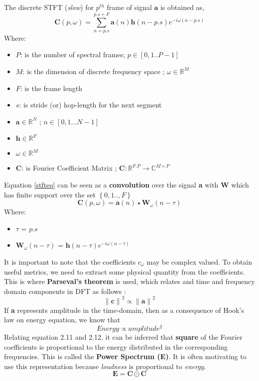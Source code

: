 \noindent The discrete STFT (\textit{slow}) for $p^{th}$ frame of signal $\textbf{a}$ is obtained as,
\begin{equation}
\label{stfteq}
\textbf{C}(p, \omega ) = \displaystyle\sum_{n=p.s}^{p.s + F}\textbf{a}(n)\textbf{h}(n-p.s)e^{-i \omega (n-p.s)}
\end{equation}
Where:
\begin{itemize}[label=]
    \setlength\itemsep{0em}
    \item $P$: is the number of spectral frames; $p \in [0,1..P-1]$ 
    \item $M$: is the dimension of discrete frequency space ; $\omega \in \mathbb{R}^{M}$
    \item $F$: is the frame length 
    \item $s$: is stride (or) hop-length for the next segment
    \item $\textbf{a} \in  \mathbb{R}^{N}$ ; $n \in [0,1...N-1]$
    \item $\textbf{h} \in  \mathbb{R}^{F}$
    \item $\omega \in  \mathbb{R}^{M}$
    \item $\textbf{C}$: is Fourier Coefficient Matrix ; $\textbf{C} : \mathbb{R}^{F.P} \rightarrow \mathbb{C}^{M \times P}$
\end{itemize}

\noindent Equation \ref{stfteq} can be seen as a \textbf{convolution} over the signal \textbf{a} with \textbf{W} which has finite support over the set $\left\{0,1..,F \right\}$
\begin{equation}
\boxed
{
  \textbf{C}(p, \omega ) = \textbf{a}(n) \star \textbf{W}_{\omega}(n- \tau)
}
\end{equation}
Where:
\begin{itemize}[label=]
    \setlength\itemsep{0em}
    \item $ \tau$ = $p.s$
    \item $\textbf{W}_{\omega}(n- \tau)$ = $\textbf{h}(n- \tau )e^{-i \omega (n- \tau)}$
\end{itemize}
It is important to note that the coefficients $c_{\omega}$ may be complex valued. To obtain useful metrics, we need to extract some physical quantity from the coefficients. This is where \textbf{Parseval's theorem} is used, which relates and time and frequency domain components in DFT as follows \cite{allen} :
\begin{equation}
{\|\textbf{c}\|}^2 \propto {\|\textbf{a}\|}^2
\end{equation}
If \textbf{a} represents amplitude in the time-domain, then as a consequence of Hook's law  on energy equation, we know that
\begin{equation}
Energy \propto amplitude^2
\end{equation}
Relating equation 2.11 and 2.12, it can be inferred that \textbf{square} of the Fourier coefficients is proportional to the energy distributed in the corresponding frequencies. This is called the \textbf{Power Spectrum (E)}. It is often motivating to use this representation because \textit{loudness} is proportional to \textit{energy}.
\begin{equation}
\label{energy}
\textbf{E} = \textbf{C} \odot \textbf{C}
\end{equation}

